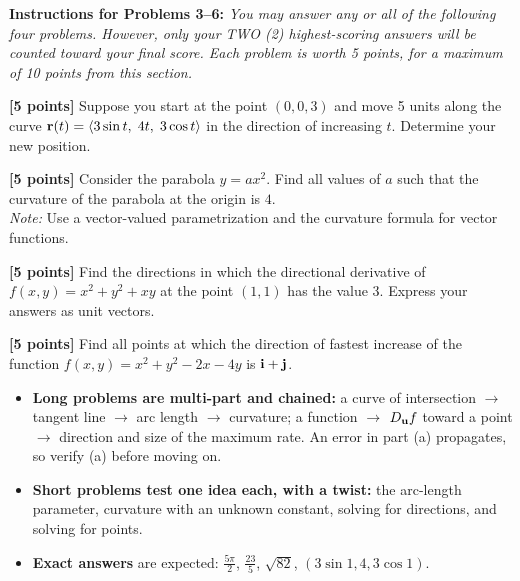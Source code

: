 \textbf{Instructions for Problems 3--6:} \emph{You may answer any or all of the
following four problems. However, only your TWO (2) highest-scoring answers
will be counted toward your final score. Each problem is worth 5 points, for a
maximum of 10 points from this section.}

\begin{questions}[resume]
\item \textbf{[5 points]} Suppose you start at the point $(0,0,3)$ and move 5 units
      along the curve $\mathbf{r}(t)=\left\langle 3\sin t,\;4t,\;3\cos t \right\rangle$ in the direction of
      increasing $t$. Determine your new position.
\item \textbf{[5 points]} Consider the parabola $y=ax^2$. Find all values of $a$ such
      that the curvature of the parabola at the origin is $4$.\\
      \emph{Note:} Use a vector-valued parametrization and the curvature formula
      for vector functions.
\item \textbf{[5 points]} Find the directions in which the directional derivative of
      $f(x,y)=x^2+y^2+xy$ at the point $(1,1)$ has the value $3$. Express your
      answers as unit vectors.
\item \textbf{[5 points]} Find all points at which the direction of fastest increase
      of the function $f(x,y)=x^2+y^2-2x-4y$ is $\mathbf{i}+\mathbf{j}$.
\end{questions}

\begin{remark}
\begin{itemize}
\item \textbf{Long problems are multi-part and chained:} a curve of intersection
      $\to$ tangent line $\to$ arc length $\to$ curvature; a function $\to$
      $D_{\mathbf{u}} f$ toward a point $\to$ direction and size of the maximum rate.
      An error in part (a) propagates, so verify (a) before moving on.
\item \textbf{Short problems test one idea each, with a twist:} the arc-length
      parameter, curvature with an unknown constant, solving for directions,
      and solving for points.
\item \textbf{Exact answers} are expected: $\frac{5\pi}{2}$, $\frac{23}{5}$, $\sqrt{82}$, $(3\sin1,4,3\cos1)$.
\end{itemize}
\end{remark}
